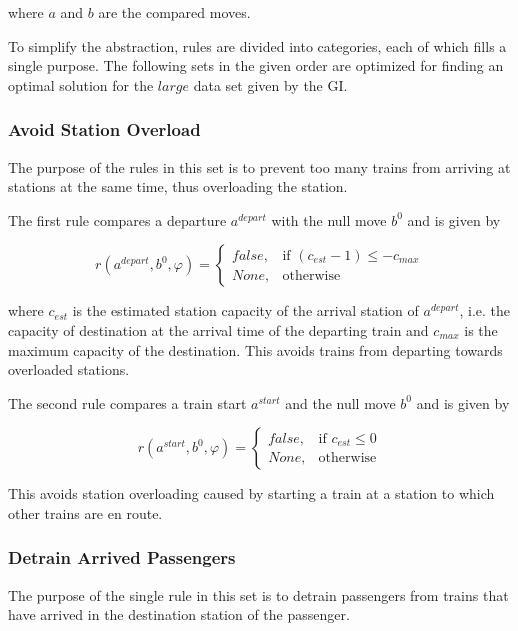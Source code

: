 \documentclass[a4paper,10pt,parskip]{article}
\begin{document}
\noindent where $a$ and $b$ are the compared moves.

To simplify the abstraction, rules are divided into categories, each of which 
fills a single purpose. The following sets in the given order are optimized for 
finding an optimal solution for the $large$ data set given by the GI.

\subsubsection{Avoid Station Overload}
\label{rule:1}

The purpose of the rules in this set is to prevent too many trains from arriving 
at stations at the same time, thus overloading the station. 

The first rule compares a departure $a^{depart}$ with the null move $b^0$ and is 
given by

\[
    r(a^{depart}, b^0, \varphi) = 
    \begin{cases}
        false,& \text{if } (c_{est} - 1) \leq -c_{max} \\
        None,& \text{otherwise}
    \end{cases}
\]

\noindent where $c_{est}$ is the estimated station capacity of the arrival station of 
$a^{depart}$, i.e. the capacity of destination at the arrival time of 
the departing train and $c_{max}$ is the maximum capacity of the destination. 
This avoids trains from departing towards overloaded stations.

The second rule compares a train start $a^{start}$ and the null move $b^0$ and is 
given by 

\[
    r(a^{start}, b^0, \varphi) = 
    \begin{cases}
        false,& \text{if } c_{est} \leq 0 \\
        None,& \text{otherwise}
    \end{cases}
\]

\noindent This avoids station overloading caused by starting a train at a station 
to which other trains are en route.

\subsubsection{Detrain Arrived Passengers}
\label{rule:2}

The purpose of the single rule in this set is to detrain passengers from trains that 
have arrived in the destination station of the passenger.
\end{document}
